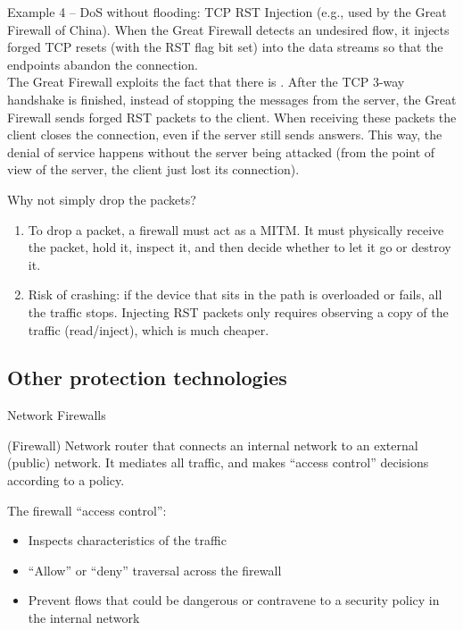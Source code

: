 \begin{parag}{Example 4 -- DoS without flooding: TCP RST Injection}
    (e.g., used by the Great Firewall of China). When the Great Firewall detects an undesired flow, it injects forged TCP resets (with the RST flag bit set) into the data streams so that the endpoints abandon the connection.\\
	The Great Firewall exploits the fact that there is . After the TCP 3-way handshake is finished, instead of stopping the messages from the server, the Great Firewall sends forged RST packets to the client. When receiving these packets the client closes the connection, even if the server still sends answers. This way, the denial of service happens without the server being attacked (from the point of view of the server, the client just lost its connection).
	\begin{subparag}{Why not simply drop the packets?}
		\begin{enumerate}
		    \item To drop a packet, a firewall must act as a MITM. It must physically receive the packet, hold it, inspect it, and then decide whether to let it go or destroy it.
		    \item Risk of crashing: if the device that sits in the path is overloaded or fails, all the traffic stops. Injecting RST packets only requires observing a copy of the traffic (read/inject), which is much cheaper.
		\end{enumerate}
	\end{subparag}
\end{parag}

\subsection{Other protection technologies}
\begin{parag}{Network Firewalls}
    \begin{definition}{(Firewall)}
    Network router that connects an internal network to an external (public) network. It mediates all traffic, and makes ``access control'' decisions according to a policy.
    \end{definition}
	The firewall ``access control'':
	\begin{itemize}
	    \item Inspects characteristics of the traffic
	    \item ``Allow'' or ``deny'' traversal across the firewall
	    \item Prevent flows that could be dangerous or contravene to a security policy in the internal network
	\end{itemize}
\end{parag}

